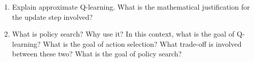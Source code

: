 \documentclass[]{article}
\begin{document}
\begin{enumerate}
\item Explain approximate Q-learning. What is the mathematical justification for the update step involved? \\

\item What is policy search? Why use it? In this context, what is the goal of Q-learning? What is the goal of action selection? What trade-off is involved between these two? What is the goal of policy search?
\end{enumerate}
\end{document}
